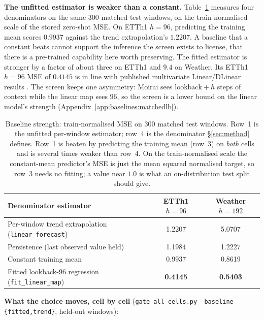 \textbf{The unfitted estimator is weaker than a constant.}
Table~\ref{tab:gate_baselines} measures four denominators on the same 300
matched test windows, on the train-normalised scale of the stored zero-shot MSE.
On ETTh1 $h{=}96$, predicting the training mean scores $0.9937$ against the
trend extrapolation's $1.2207$.  A baseline that a constant beats cannot support
the inference the screen exists to license, that there is a pre-trained
capability here worth preserving.  The fitted estimator is stronger by a factor
of about three on ETTh1 and $9.4$ on Weather.  Its ETTh1 $h{=}96$ MSE of $0.4145$
is in line with published multivariate Linear/DLinear results
\citep{zeng2023transformers}.  The screen keeps one asymmetry: Moirai sees
$\text{lookback}+h$ steps of context while the linear map sees $96$, so the
screen is a lower bound on the linear model's strength
(Appendix~\ref{app:baselines:matchedlb}).

\begin{table}[!htbp]
\centering\small
\caption{Baseline strength: train-normalised MSE on 300 matched test windows.
Row~1 is the unfitted per-window estimator; row~4 is the
denominator \S\ref{sec:method} defines. Row~1 is beaten by predicting the
training mean (row~3) on \emph{both} cells and is several times weaker than
row~4. On the train-normalised scale the constant-mean predictor's MSE is just
the mean squared normalised target, so row~3 needs no fitting; a value near
$1.0$ is what an on-distribution test split should give.}
\label{tab:gate_baselines}
\begin{tabular}{@{}lcc@{}}
\toprule
Denominator estimator & ETTh1 $h{=}96$ & Weather $h{=}192$ \\
\midrule
Per-window trend extrapolation (\texttt{linear\_forecast}) & 1.2207 & 5.0707 \\
Persistence (last observed value held) & 1.1984 & 1.2227 \\
Constant training mean & 0.9937 & 0.8619 \\
Fitted lookback-96 regression (\texttt{fit\_linear\_map}) & \textbf{0.4145} & \textbf{0.5403} \\
\bottomrule
\end{tabular}
\end{table}

\textbf{What the choice moves, cell by cell}
(\texttt{gate\_all\_cells.py --baseline \{fitted,trend\}}, held-out windows):

